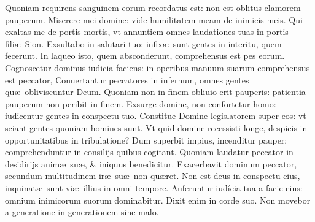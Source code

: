 \documentclass[a5paper,10pt]{book}
\def\ae{æ}
\begin{document}
\begin{multicols*}{2}
\newline \color{red} Q\color{black}uoniam requirens sanguinem eorum recordatus est: non est oblitus clamorem pauperum.
\newline \color{red} M\color{black}iserere mei domine: vide humilitatem meam de inimicis meis.
\newline \color{red} Q\color{black}ui exaltas me de portis mortis, vt annuntiem omnes laudationes tuas in portis fili\ae \ Sion.
\newline \color{red} E\color{black}xsultabo in salutari tuo: infix\ae \ sunt gentes in interitu, quem fecerunt.
\newline \color{red} I\color{black}n laqueo isto, quem absconderunt, comprehensus est pes eorum.
\newline \color{red} C\color{black}ognoscetur dominus iudicia faciens: in operibus manuum suarum comprehensus est peccator, %
\newline \color{red} C\color{black}onuertantur peccatores in infernum, omnes gentes qu\ae \ obliviscuntur Deum.
\newline \color{red} Q\color{black}uoniam non in finem obliuio erit pauperis: patientia pauperum non peribit in finem.
\newline \color{red} E\color{black}xsurge domine, non confortetur homo: iudicentur gentes in conspectu tuo.
\newline \color{red} C\color{black}onstitue Domine legislatorem super eos: vt sciant gentes quoniam homines sunt.
\newline \color{red} V\color{black}t quid domine recessisti longe, despicis in opportunitatibus in tribulatione?
\newline \color{red} D\color{black}um superbit impius, incenditur pauper: comprehenduntur in consilijs quibus cogitant.
\newline \color{red} Q\color{black}uoniam laudatur peccator in desidirijs anim\ae \ su\ae , \& iniquus benedicitur.
\newline \color{red} E\color{black}xacerbavit dominum peccator, secundum multitudinem ir\ae \ su\ae \ non qu\ae ret.
\newline \color{red} N\color{black}on est deus in conspectu eius, inquinat\ae \ sunt vi\ae \ illius in omni tempore.
\newline \color{red} A\color{black}uferuntur iudícia tua a facie eius: omnium inimicorum suorum dominabitur.
\newline \color{red} D\color{black}ixit enim in corde suo. Non movebor a generatione in generationem sine malo.

\end{multicols*}
\end{document}
